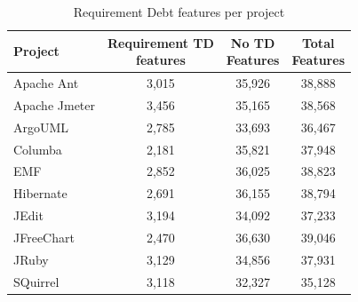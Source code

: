 \begin{table}[!hbt]
    \begin{center}
        \caption{Requirement Debt features per project}
        \label{tbl:requirement_features_per_project}
        \begin{tabular}{l| c c c }
        \toprule
        \textbf{Project} & \thead{Requirement TD\\features} & \thead{No TD\\Features} & \thead{Total\\Features} \\
        \midrule
        Apache Ant    & 3,015  & 35,926 & 38,888  \\
        Apache Jmeter & 3,456  & 35,165 & 38,568  \\
        ArgoUML       & 2,785  & 33,693 & 36,467  \\
        Columba       & 2,181  & 35,821 & 37,948  \\
        EMF           & 2,852  & 36,025 & 38,823  \\
        Hibernate     & 2,691  & 36,155 & 38,794  \\
        JEdit         & 3,194  & 34,092 & 37,233  \\
        JFreeChart    & 2,470  & 36,630 & 39,046  \\
        JRuby         & 3,129  & 34,856 & 37,931  \\
        SQuirrel      & 3,118  & 32,327 & 35,128  \\
        \bottomrule
        \end{tabular}
    \end{center}    
\end{table}

\clearpage

